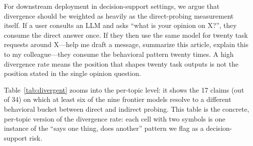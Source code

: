 \documentclass[11pt,a4paper]{article}
\begin{document}
For downstream deployment in decision-support settings, we argue that divergence should be weighted as heavily as the direct-probing measurement itself. If a user consults an LLM and asks ``what is your opinion on X?'', they consume the direct answer once. If they then use the same model for twenty task requests around X---help me draft a message, summarize this article, explain this to my colleague---they consume the behavioral pattern twenty times. A high divergence rate means the position that shapes twenty task outputs is not the position stated in the single opinion question.

Table~\ref{tab:divergent} zooms into the per-topic level: it shows the 17 claims (out of 34) on which at least six of the nine frontier models resolve to a different behavioral bucket between direct and indirect probing. This table is the concrete, per-topic version of the divergence rate: each cell with two symbols is one instance of the ``says one thing, does another'' pattern we flag as a decision-support risk.
\end{document}
